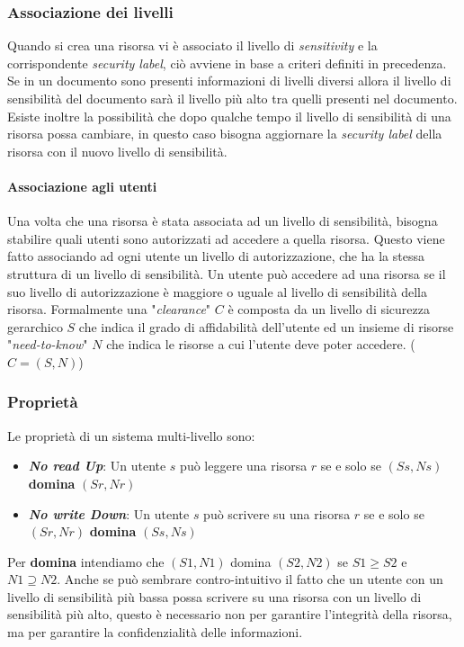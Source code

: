         \subsubsection{Associazione dei livelli}
            Quando si crea una risorsa vi è associato il livello di \textit{sensitivity} e la corrispondente \textit{security label}, ciò avviene in base a criteri definiti in precedenza. Se in un documento sono presenti informazioni di livelli diversi allora il livello di sensibilità del documento sarà il livello più alto tra quelli presenti nel documento.\newline
            Esiste inoltre la possibilità che dopo qualche tempo il livello di sensibilità di una risorsa possa cambiare, in questo caso bisogna aggiornare la \textit{security label} della risorsa con il nuovo livello di sensibilità.
            \paragraph{Associazione agli utenti}
                Una volta che una risorsa è stata associata ad un livello di sensibilità, bisogna stabilire quali utenti sono autorizzati ad accedere a quella risorsa. Questo viene fatto associando ad ogni utente un livello di autorizzazione, che ha la stessa struttura di un livello di sensibilità. Un utente può accedere ad una risorsa se il suo livello di autorizzazione è maggiore o uguale al livello di sensibilità della risorsa. Formalmente una "\textit{clearance}" $C$ è composta da un livello di sicurezza gerarchico $S$ che indica il grado di affidabilità dell'utente ed un insieme di risorse "\textit{need-to-know}" $N$ che indica le risorse a cui l'utente deve poter accedere. ($C = (S,N)$)
        \subsubsection{Proprietà}
            Le proprietà di un sistema multi-livello sono:
            \begin{itemize}
                \item \textit\textbf{No read Up}: Un utente $s$ può leggere una risorsa $r$ se e solo se $(Ss,Ns)$ \textbf{domina} $(Sr,Nr)$ 
                \item \textit\textbf{No write Down}: Un utente $s$ può scrivere su una risorsa $r$ se e solo se $(Sr,Nr)$ \textbf{domina} $(Ss,Ns)$
            \end{itemize}
            Per \textbf{domina} intendiamo che $(S1,N1)$ domina $(S2,N2)$ se $S1 \geq S2$ e $N1 \supseteq N2$.\newline
            Anche se può sembrare contro-intuitivo il fatto che un utente con un livello di sensibilità più bassa possa scrivere su una risorsa con un livello di sensibilità più alto, questo è necessario non per garantire l'integrità della risorsa, ma per garantire la confidenzialità delle informazioni.
